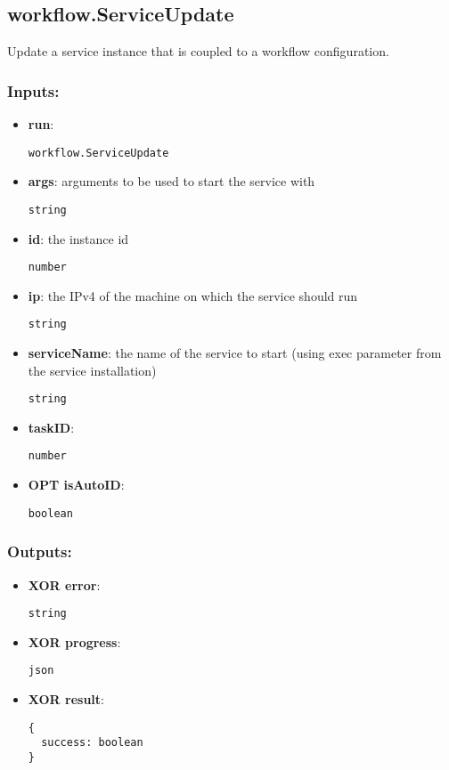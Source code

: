 \subsection{workflow.ServiceUpdate}
\label{ch:builtinservices:workflow.ServiceUpdate}
Update a service instance that is coupled to a workflow configuration.
\subsubsection*{Inputs:}
\begin{itemize}
    \item \textbf{run}: 
\begin{lstlisting}
workflow.ServiceUpdate
\end{lstlisting}
    \item \textbf{args}: arguments to be used to start the service with
\begin{lstlisting}
string
\end{lstlisting}
    \item \textbf{id}: the instance id
\begin{lstlisting}
number
\end{lstlisting}
    \item \textbf{ip}: the IPv4 of the machine on which the service should run
\begin{lstlisting}
string
\end{lstlisting}
    \item \textbf{serviceName}: the name of the service to start (using exec parameter from the service installation)
\begin{lstlisting}
string
\end{lstlisting}
    \item \textbf{taskID}: 
\begin{lstlisting}
number
\end{lstlisting}
    \item \textbf{OPT isAutoID}: 
\begin{lstlisting}
boolean
\end{lstlisting}
  \end{itemize}

\subsubsection*{Outputs:}
\begin{itemize}
    \item \textbf{XOR error}: 
\begin{lstlisting}
string
\end{lstlisting}
    \item \textbf{XOR progress}: 
\begin{lstlisting}
json
\end{lstlisting}
    \item \textbf{XOR result}: 
\begin{lstlisting}
{
  success: boolean
}
\end{lstlisting}
  \end{itemize}

